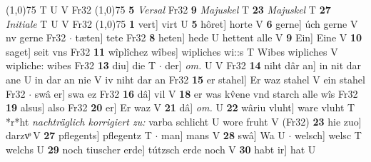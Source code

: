 \documentclass[8pt,a4paper,notitlepage]{article}
\begin{document}
\begin{table}[ht]
\begin{minipage}[t]{0.5\linewidth}
\begin{tabular}{rl}
\end{tabular}
\scriptsize
\line(1,0){75} \newline
T U V Fr32 \newline
\line(1,0){75} \newline
\textbf{5} \textit{Versal} Fr32  \textbf{9} \textit{Majuskel} T  \textbf{23} \textit{Majuskel} T  \textbf{27} \textit{Initiale} T U V Fr32  \newline
\line(1,0){75} \newline
\textbf{1} vert] virt U \textbf{5} hôret] horte V \textbf{6} gerne] úch gerne V nv gerne Fr32  $\cdot$ tæten] tete Fr32 \textbf{8} heten] hede U hettent alle V \textbf{9} Ein] Eine V \textbf{10} saget] seit vns Fr32 \textbf{11} wîplîchez wîbes] wipliches wi::s T Wibes wipliches V wipliche: wibes Fr32 \textbf{13} diu] die T  $\cdot$ der] \textit{om.} U V Fr32 \textbf{14} niht dâr an] in nit dar ane U in dar an nie V iv niht dar an Fr32 \textbf{15} er stahel] Er waz stahel V ein stahel Fr32  $\cdot$ swâ er] swa ez Fr32 \textbf{16} dâ] vil V \textbf{18} er was kv̂ene vnd starch alle wîs Fr32 \textbf{19} alsus] also Fr32 \textbf{20} er] Er waz V \textbf{21} dâ] \textit{om.} U \textbf{22} wâriu vluht] ware vluht T *r*ht \textit{nachträglich korrigiert zu:} varba schlicht U wore fruht V (Fr32) \textbf{23} hie zuo] darzvͦ V \textbf{27} pflegents] pflegentz T  $\cdot$ man] mans V \textbf{28} swâ] Wa U  $\cdot$ welsch] welsc T welchs U \textbf{29} noch tiuscher erde] tútzsch erde noch V \textbf{30} habt ir] hat U \newline
\end{minipage}
\end{table}
\end{document}

